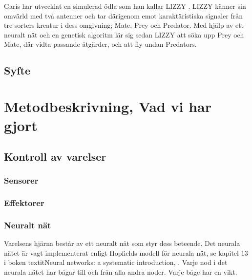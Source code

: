 \documentclass[titlepage, twocolumn, a4paper, 12pt]{article}
\begin{document}
Garis har utvecklat en simulerad ödla som han kallar LIZZY \cite{garis}. LIZZY känner sin omvärld med två antenner och tar därigenom emot karaktäristiska signaler från tre sorters kreatur i dess omgivning; Mate, Prey och Predator. Med hjälp av ett neuralt nät och en genetisk algoritm lär sig sedan LIZZY att söka upp Prey och Mate, där vidta passande åtgärder, och att fly undan Predators.

\subsection{Syfte}

\section{Metodbeskrivning, Vad vi har gjort}


\subsection{Kontroll av varelser}
\subsubsection{Sensorer}

        

\subsubsection{Effektorer}

\subsubsection{Neuralt nät}
Varelsens hjärna består av ett neuralt nät som styr dess beteende. Det neurala nätet är vagt implementerat enligt Hopfields modell för neurala nät, se kapitel 13 i boken textit{Neural networks: a systematic introduction}, \cite{raul}. Varje nod i det neurala nätet har bågar till och från alla andra noder. Varje båge har en vikt.
\end{document}

